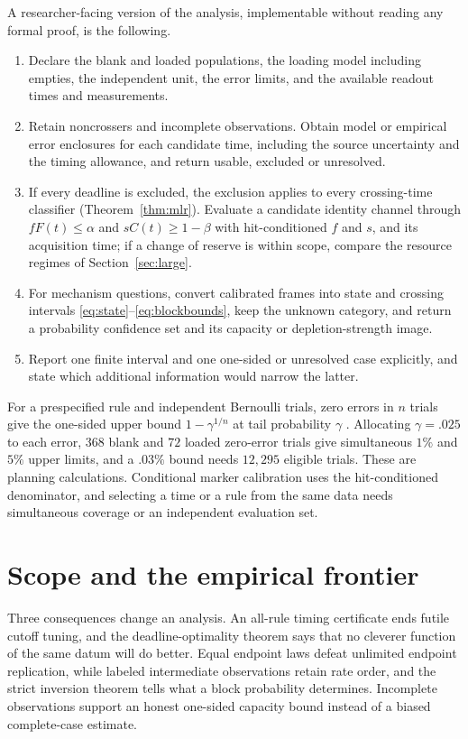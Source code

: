 \documentclass[11pt,a4paper]{article}
\theoremstyle{plain}
\theoremstyle{definition}
\theoremstyle{remark}
\begin{document}
A researcher-facing version of the analysis, implementable without reading any formal proof, is the following.
\begin{enumerate}[label=(\arabic*)]
\item Declare the blank and loaded populations, the loading model including empties, the independent unit, the error limits, and the available readout times and measurements.
\item Retain noncrossers and incomplete observations. Obtain model or empirical error enclosures for each candidate time, including the source uncertainty and the timing allowance, and return usable, excluded or unresolved.
\item If every deadline is excluded, the exclusion applies to every crossing-time classifier (Theorem~\ref{thm:mlr}). Evaluate a candidate identity channel through $fF(t)\le\alpha$ and $sC(t)\ge1-\beta$ with hit-conditioned $f$ and $s$, and its acquisition time; if a change of reserve is within scope, compare the resource regimes of Section~\ref{sec:large}.
\item For mechanism questions, convert calibrated frames into state and crossing intervals \eqref{eq:state}--\eqref{eq:blockbounds}, keep the unknown category, and return a probability confidence set and its capacity or depletion-strength image.
\item Report one finite interval and one one-sided or unresolved case explicitly, and state which additional information would narrow the latter.
\end{enumerate}
For a prespecified rule and independent Bernoulli trials, zero errors in $n$ trials give the one-sided upper bound $1-\gamma^{1/n}$ at tail probability $\gamma$ \citep{clopperpearson1934,hanley1983}. Allocating $\gamma=.025$ to each error, $368$ blank and $72$ loaded zero-error trials give simultaneous $1\%$ and $5\%$ upper limits, and a $.03\%$ bound needs $12{,}295$ eligible trials. These are planning calculations. Conditional marker calibration uses the hit-conditioned denominator, and selecting a time or a rule from the same data needs simultaneous coverage or an independent evaluation set.

\section{Scope and the empirical frontier}\label{sec:discussion}
Three consequences change an analysis. An all-rule timing certificate ends futile cutoff tuning, and the deadline-optimality theorem says that no cleverer function of the same datum will do better. Equal endpoint laws defeat unlimited endpoint replication, while labeled intermediate observations retain rate order, and the strict inversion theorem tells what a block probability determines. Incomplete observations support an honest one-sided capacity bound instead of a biased complete-case estimate.
\end{document}
